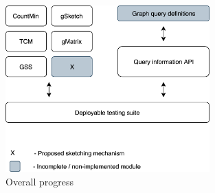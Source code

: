 \begin{figure}[H]
    \centering
    \includegraphics[width=0.7\textwidth]{images/progress}
    \caption{Overall progress}
    \label{figure:progress}
\end{figure}